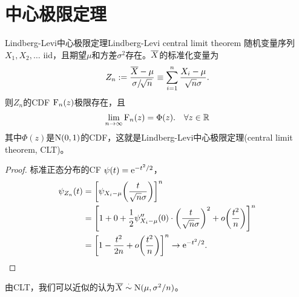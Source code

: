 \section{中心极限定理}
\begin{theorem}{Lindberg-Levi中心极限定理}{Lindberg-Levi central limit theorem}
	随机变量序列$X_1, X_2,\ldots$ iid，且期望$\mu$和方差$\sigma^2$存在。$\overline{X}$的标准化变量为
	\begin{align}
		Z_n:=\frac{\overline{X}-\mu}{\sigma/\!\sqrt n}\equiv\sum_{i=1}^n\frac{X_i-\mu}{\sqrt n\sigma}.
	\end{align}
	则$Z_n$的CDF $\operatorname{F}_n(z)$极限存在，且
	\begin{align}
		\lim_{n\to\infty}\operatorname{F}_n(z)=\Phi(z).\quad\forall z\in\mathbb R
	\end{align}
	其中$\Phi(z)$是$\operatorname{N}(0,1)$的CDF，这就是Lindberg-Levi中心极限定理(central limit theorem, CLT)。
\end{theorem}
\begin{proof}
	标准正态分布的CF $\psi(t)=\mathop{}\!\mathrm{e}^{-t^2/2}$，%
	\begin{align*}
		\psi_{Z_n}(t)&=\left[\psi_{X_i-\mu}\biggl(\frac{t}{\sqrt n\sigma}\biggr)\right]^n\\
		&=\left[1+0+\frac12\psi''_{X_i-\mu}(0)\cdot\biggl(\frac{t}{\sqrt n\sigma}\biggr)^2+o\biggl(\frac{t^2}n\biggr)\right]^n\\
		&=\left[1-\frac{t^2}{2n}+o\biggl(\frac{t^2}n\biggr)\right]^n\to\mathop{}\!\mathrm{e}^{-t^2/2}.
	\end{align*}
\end{proof}

由CLT，我们可以近似的认为$\overline{X}\overset\cdot\sim\operatorname{N}(\mu,\sigma^2/n)$。

